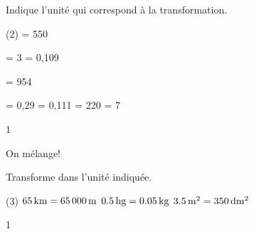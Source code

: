 \documentclass[a4paper,11pt]{report}
\begin{document}
\begin{exop}
{
	Indique l'unité qui correspond à la transformation.
\begin{tasks}(2)
    \task {}=  550 \dotfill \hspace{0.3cm}
    
    \task {} = 3\dotfill \hspace{0.3cm}
  \task {}= 0,109 \dotfill \hspace{0.3cm}
   
    \task {}= 954 \dotfill \hspace{0.3cm}
    
     \task {}= 0,29\dotfill \hspace{0.3cm}
     \task {}= 0,111\dotfill \hspace{0.3cm}
     \task {}= 220\dotfill \hspace{0.3cm}
     \task {}= 7 \dotfill \hspace{0.3cm}
\end{tasks} 
}
{1}
\end{exop}

\begin{resolu}
    {On mélange!}
    {Transforme dans l'unité indiquée.

\begin{tasks}(3)
    \task $\tunit{65}{\kilo m}= \tunit{65000}{\m}$
    \task $\tunit{0,5}{\hecto g} = \tunit{0,05}{\kilo g}$
    \task $\tunit{3,5}{\m^2}= \tunit{350}{\deci m^2}$
    
\end{tasks}   
    }
{1}
\end{resolu}
\end{document}
